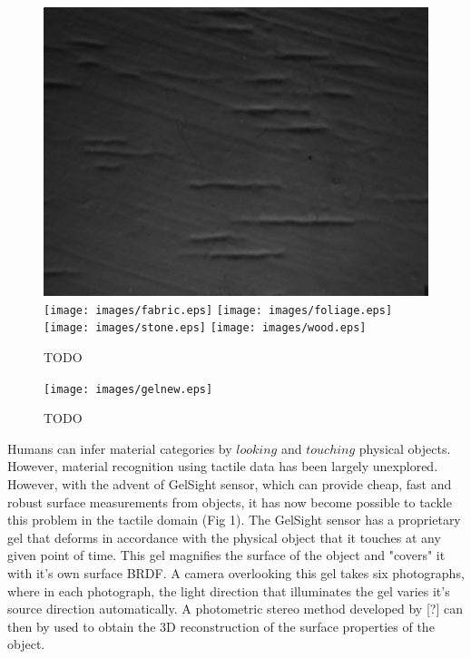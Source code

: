 \documentclass[10pt,twocolumn,letterpaper]{article}
\begin{document}
\begin{figure}[h]
\endminipage\hfill
{}
\includegraphics[width=\linewidth]{images/wood.png}
\endminipage\\

\texttt{[image: images/fabric.eps]}
\endminipage\hfill
{}
\texttt{[image: images/foliage.eps]}
\endminipage\hfill
{}
\texttt{[image: images/stone.eps]}
\endminipage\hfill
{}
\texttt{[image: images/wood.eps]}
\endminipage\\

\caption{TODO}
\end{figure}


\begin{figure}[t]
\centering
	\texttt{[image: images/gelnew.eps]}
   \caption{TODO }
\end{figure}


Humans can infer material categories by $looking$ and $touching$ physical objects. However, material recognition using tactile data has been largely unexplored. 
However, with the advent of GelSight sensor, which can provide cheap, fast and robust surface measurements from objects, it has now become possible to tackle this 
problem in the tactile domain (Fig 1). The GelSight sensor has a proprietary gel that deforms in accordance with the physical object that it touches at any given
point of time. This gel magnifies the surface of the object and "covers" it with it's own surface BRDF. A camera overlooking this gel takes six photographs,
where in each photograph, the light direction that illuminates the gel varies it's source direction automatically. A photometric stereo method developed by [?] can then
by used to obtain the 3D reconstruction of the surface properties of the object. 
\end{document}

